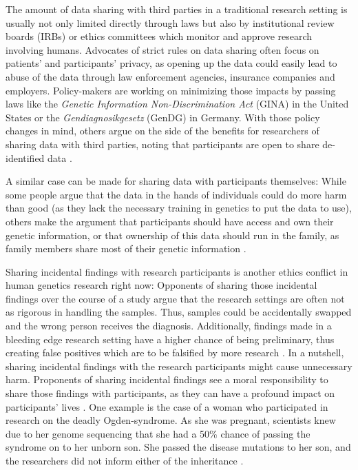 \documentclass[runningheads,a4paper]{llncs}
\begin{document}
The amount of data sharing with third parties in a traditional research setting is usually not only limited directly through laws but also by institutional review boards (IRBs) or ethics committees which monitor and approve research involving humans. Advocates of strict rules on data sharing often focus on patients' and participants' privacy, as opening up the data could easily lead to abuse of the data through law enforcement agencies, insurance companies and employers. Policy-makers are working on minimizing those impacts by passing laws like the \emph{Genetic Information Non-Discrimination Act} (GINA) in the United States or the \emph{Gendiagnosikgesetz} (GenDG) in Germany. With those policy changes in mind, others argue on the side of the benefits for researchers of sharing data with third parties, noting that participants are open to share de-identified data \cite{trinidad}. 

A similar case can be made for sharing data with participants themselves: While some people argue that the data in the hands of individuals could do more harm than good (as they lack the necessary training in genetics to put the data to use), others make the argument that participants should have access and own their genetic information, or that ownership of this data should run in the family, as family members share most of their genetic information \cite{lucassen}.  

Sharing incidental findings with research participants is another ethics conflict in human genetics research right now: Opponents of sharing those incidental findings over the course of a study argue that the research settings are often not as rigorous in handling the samples. Thus, samples could be accidentally swapped and the wrong person receives the diagnosis. Additionally, findings made in a bleeding edge research setting have a higher chance of being preliminary, thus creating false positives which are to be falsified by more research \cite{genomesunzipped}. In a nutshell, sharing incidental findings with the research participants might cause unnecessary harm. 
Proponents of sharing incidental findings see a moral responsibility to share those findings with participants, as they can have a profound impact on participants' lives \cite{miller}. One example is the case of a woman who participated in research on the deadly Ogden-syndrome. As she was pregnant, scientists knew due to her genome sequencing that she had a 50\% chance of passing the syndrome on to her unborn son. She passed the disease mutations to her son, and the researchers did not inform either of the inheritance \cite{lyon}.    
\end{document}
